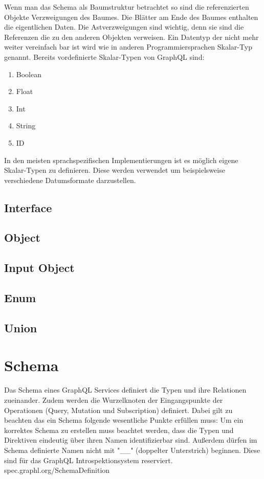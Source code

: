 \documentclass[bachelor, german ]{hgbthesis}
\begin{document}
Wenn man das Schema als Baumstruktur betrachtet so sind die referenzierten Objekte Verzweigungen des Baumes.
Die Blätter am Ende des Baumes enthalten die eigentlichen Daten.
Die Astverzweigungen sind wichtig, denn sie sind die Referenzen die zu den anderen Objekten verweisen.
Ein Datentyp der nicht mehr weiter vereinfach bar ist wird wie in anderen Programmiersprachen Skalar-Typ genannt.
Bereits vordefinierte Skalar-Typen von GraphQL sind:

\begin{enumerate}
    \item Boolean
    \item Float
    \item Int
    \item String
    \item ID
\end{enumerate}
In den meisten sprachspezifischen Implementierungen ist es möglich eigene Skalar-Typen zu definieren. Diese werden verwendet um beispielsweise verschiedene Datumsformate darzustellen.

\subsection{Interface}
\subsection{Object}
\subsection{Input Object}
\subsection{Enum}
\subsection{Union}

\section{Schema}
Das Schema eines GraphQL Services definiert die Typen und ihre Relationen zueinander. Zudem werden die Wurzelknoten der Eingangspunkte der Operationen (Query, Mutation und Subscription) definiert.
Dabei gilt zu beachten das ein Schema folgende wesentliche Punkte erfüllen muss:
Um ein korrektes Schema zu erstellen muss beachtet werden, dass die Typen und Direktiven eindeutig über ihren Namen identifizierbar sind. Außerdem dürfen im Schema definierte Namen nicht mit "__" (doppelter Unterstrich) beginnen.
Diese sind für das GraphQL Introspektionsystem reserviert. spec.graphl.org/SchemaDefinition
\end{document}
